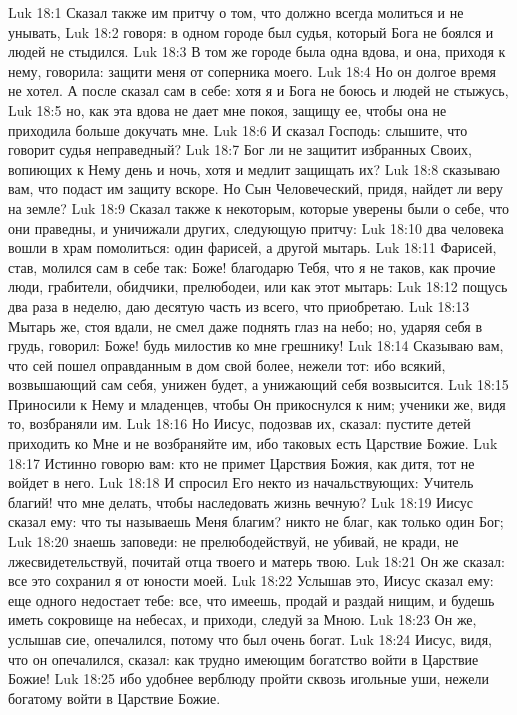 Luk 18:1  Сказал также им притчу о том, что должно всегда молиться и не унывать,
Luk 18:2  говоря: в одном городе был судья, который Бога не боялся и людей не стыдился.
Luk 18:3  В том же городе была одна вдова, и она, приходя к нему, говорила: защити меня от соперника моего.
Luk 18:4  Но он долгое время не хотел. А после сказал сам в себе: хотя я и Бога не боюсь и людей не стыжусь,
Luk 18:5  но, как эта вдова не дает мне покоя, защищу ее, чтобы она не приходила больше докучать мне.
Luk 18:6  И сказал Господь: слышите, что говорит судья неправедный?
Luk 18:7  Бог ли не защитит избранных Своих, вопиющих к Нему день и ночь, хотя и медлит защищать их?
Luk 18:8  сказываю вам, что подаст им защиту вскоре. Но Сын Человеческий, придя, найдет ли веру на земле?
Luk 18:9  Сказал также к некоторым, которые уверены были о себе, что они праведны, и уничижали других, следующую притчу:
Luk 18:10  два человека вошли в храм помолиться: один фарисей, а другой мытарь.
Luk 18:11  Фарисей, став, молился сам в себе так: Боже! благодарю Тебя, что я не таков, как прочие люди, грабители, обидчики, прелюбодеи, или как этот мытарь:
Luk 18:12  пощусь два раза в неделю, даю десятую часть из всего, что приобретаю.
Luk 18:13  Мытарь же, стоя вдали, не смел даже поднять глаз на небо; но, ударяя себя в грудь, говорил: Боже! будь милостив ко мне грешнику!
Luk 18:14  Сказываю вам, что сей пошел оправданным в дом свой более, нежели тот: ибо всякий, возвышающий сам себя, унижен будет, а унижающий себя возвысится.
Luk 18:15  Приносили к Нему и младенцев, чтобы Он прикоснулся к ним; ученики же, видя то, возбраняли им.
Luk 18:16  Но Иисус, подозвав их, сказал: пустите детей приходить ко Мне и не возбраняйте им, ибо таковых есть Царствие Божие.
Luk 18:17  Истинно говорю вам: кто не примет Царствия Божия, как дитя, тот не войдет в него.
Luk 18:18  И спросил Его некто из начальствующих: Учитель благий! что мне делать, чтобы наследовать жизнь вечную?
Luk 18:19  Иисус сказал ему: что ты называешь Меня благим? никто не благ, как только один Бог;
Luk 18:20  знаешь заповеди: не прелюбодействуй, не убивай, не кради, не лжесвидетельствуй, почитай отца твоего и матерь твою.
Luk 18:21  Он же сказал: все это сохранил я от юности моей.
Luk 18:22  Услышав это, Иисус сказал ему: еще одного недостает тебе: все, что имеешь, продай и раздай нищим, и будешь иметь сокровище на небесах, и приходи, следуй за Мною.
Luk 18:23  Он же, услышав сие, опечалился, потому что был очень богат.
Luk 18:24  Иисус, видя, что он опечалился, сказал: как трудно имеющим богатство войти в Царствие Божие!
Luk 18:25  ибо удобнее верблюду пройти сквозь игольные уши, нежели богатому войти в Царствие Божие.

